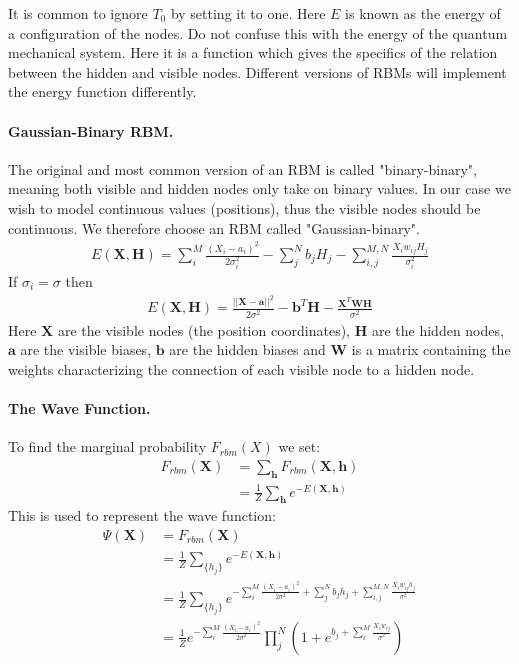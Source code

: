 \documentclass[%
oneside,                 %
final,                   %
10pt]{article}
\begin{document}
It is common to ignore $T_0$ by setting it to one. Here $E$ is known
as the energy of a configuration of the nodes. Do not confuse this
with the energy of the quantum mechanical system. Here it is a
function which gives the specifics of the relation between the hidden
and visible nodes. Different versions of RBMs will implement the
energy function differently.

\paragraph{Gaussian-Binary RBM.}
The original and most common version of an RBM is called "binary-binary", meaning both visible and hidden nodes only take on binary values. In our case we wish to model continuous values (positions), thus the visible nodes should be continuous. We therefore choose an RBM called "Gaussian-binary". 
\begin{align}
	E(\mathbf{X}, \mathbf{H}) = \sum_i^M \frac{(X_i - a_i)^2}{2\sigma_i^2} - \sum_j^N b_j H_j - \sum_{i,j}^{M,N} \frac{X_i w_{ij} H_j}{\sigma_i^2} 
\end{align}
If $\sigma_i = \sigma$ then
\begin{align}
	E(\mathbf{X}, \mathbf{H})= \frac{||\mathbf{X} - \mathbf{a}||^2}{2\sigma^2} - \mathbf{b}^T \mathbf{H} - \frac{\mathbf{X}^T \mathbf{W} \mathbf{H}}{\sigma^2}
\end{align}
Here $\mathbf{X}$ are the visible nodes (the position coordinates), $\mathbf{H}$ are the hidden nodes, $\mathbf{a}$ are the visible biases, $\mathbf{b}$ are the hidden biases and $\mathbf{W}$ is a matrix containing the weights characterizing the connection of each visible node to a hidden node.

\paragraph{The Wave Function.}
To find the marginal probability $F_{rbm}(X)$ we set:
\begin{align}
	F_{rbm}(\mathbf{X}) &= \sum_\mathbf{h} F_{rbm}(\mathbf{X}, \mathbf{h}) \\
				&= \frac{1}{Z}\sum_\mathbf{h} e^{-E(\mathbf{X}, \mathbf{h})}
\end{align}
This is used to represent the wave function:
\begin{align}
\Psi (\mathbf{X}) &= F_{rbm}(\mathbf{X}) \\
&= \frac{1}{Z}\sum_{\{h_j\}} e^{-E(\mathbf{X}, \mathbf{h})} \\
&= \frac{1}{Z} \sum_{\{h_j\}} e^{-\sum_i^M \frac{(X_i - a_i)^2}{2\sigma^2} + \sum_j^N b_j h_j + \sum_{i,j}^{M,N} \frac{X_i w_{ij} h_j}{\sigma^2}} \\
&= \frac{1}{Z} e^{-\sum_i^M \frac{(X_i - a_i)^2}{2\sigma^2}} \prod_j^N (1 + e^{b_j + \sum_i^M \frac{X_i w_{ij}}{\sigma^2}}) \\
\end{align}
\end{document}
